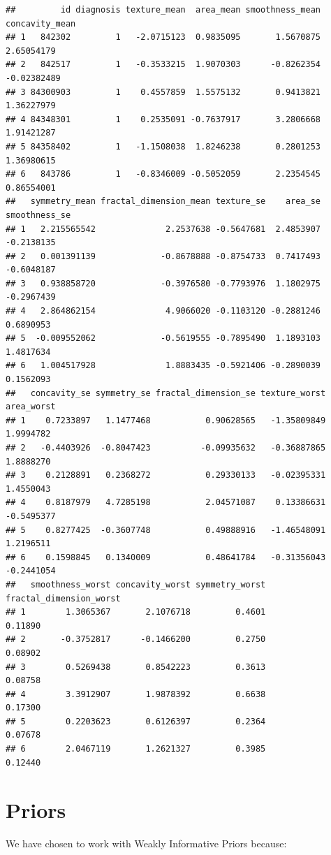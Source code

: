 \documentclass[
]{article}
\begin{document}
\begin{verbatim}
##         id diagnosis texture_mean  area_mean smoothness_mean concavity_mean
## 1   842302         1   -2.0715123  0.9835095       1.5670875     2.65054179
## 2   842517         1   -0.3533215  1.9070303      -0.8262354    -0.02382489
## 3 84300903         1    0.4557859  1.5575132       0.9413821     1.36227979
## 4 84348301         1    0.2535091 -0.7637917       3.2806668     1.91421287
## 5 84358402         1   -1.1508038  1.8246238       0.2801253     1.36980615
## 6   843786         1   -0.8346009 -0.5052059       2.2354545     0.86554001
##   symmetry_mean fractal_dimension_mean texture_se    area_se smoothness_se
## 1   2.215565542              2.2537638 -0.5647681  2.4853907    -0.2138135
## 2   0.001391139             -0.8678888 -0.8754733  0.7417493    -0.6048187
## 3   0.938858720             -0.3976580 -0.7793976  1.1802975    -0.2967439
## 4   2.864862154              4.9066020 -0.1103120 -0.2881246     0.6890953
## 5  -0.009552062             -0.5619555 -0.7895490  1.1893103     1.4817634
## 6   1.004517928              1.8883435 -0.5921406 -0.2890039     0.1562093
##   concavity_se symmetry_se fractal_dimension_se texture_worst area_worst
## 1    0.7233897   1.1477468           0.90628565   -1.35809849  1.9994782
## 2   -0.4403926  -0.8047423          -0.09935632   -0.36887865  1.8888270
## 3    0.2128891   0.2368272           0.29330133   -0.02395331  1.4550043
## 4    0.8187979   4.7285198           2.04571087    0.13386631 -0.5495377
## 5    0.8277425  -0.3607748           0.49888916   -1.46548091  1.2196511
## 6    0.1598845   0.1340009           0.48641784   -0.31356043 -0.2441054
##   smoothness_worst concavity_worst symmetry_worst fractal_dimension_worst
## 1        1.3065367       2.1076718         0.4601                 0.11890
## 2       -0.3752817      -0.1466200         0.2750                 0.08902
## 3        0.5269438       0.8542223         0.3613                 0.08758
## 4        3.3912907       1.9878392         0.6638                 0.17300
## 5        0.2203623       0.6126397         0.2364                 0.07678
## 6        2.0467119       1.2621327         0.3985                 0.12440
\end{verbatim}

\hypertarget{priors}{%
\section{Priors}\label{priors}}

We have chosen to work with Weakly Informative Priors because:
\end{document}
